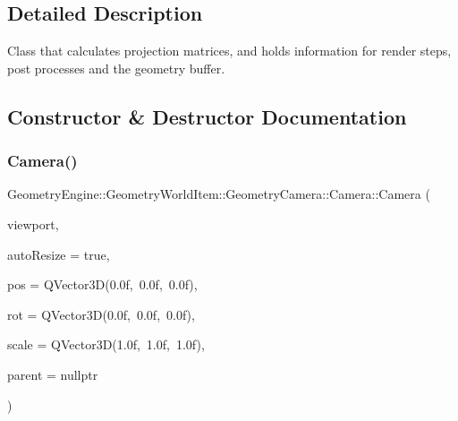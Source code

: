 \subsection{Detailed Description}
Class that calculates projection matrices, and holds information for render steps, post processes and the geometry buffer. 

\subsection{Constructor \& Destructor Documentation}
\mbox{\label{class_geometry_engine_1_1_geometry_world_item_1_1_geometry_camera_1_1_camera_a56a7538e5e5d2141832824bba448e271}} 
\subsubsection{\texorpdfstring{Camera()}{Camera()}\hspace{0.1cm}{\footnotesize\ttfamily [1/2]}}
{\footnotesize\ttfamily Geometry\+Engine\+::\+Geometry\+World\+Item\+::\+Geometry\+Camera\+::\+Camera\+::\+Camera (\begin{DoxyParamCaption}\item[{const \mbox{\hyperlink{class_geometry_engine_1_1_geometry_item_utils_1_1_viewport}{Geometry\+Item\+Utils\+::\+Viewport}} \&}]{viewport,  }\item[{bool}]{auto\+Resize = {\ttfamily true},  }\item[{const Q\+Vector3D \&}]{pos = {\ttfamily QVector3D(0.0f,~0.0f,~0.0f)},  }\item[{const Q\+Vector3D \&}]{rot = {\ttfamily QVector3D(0.0f,~0.0f,~0.0f)},  }\item[{const Q\+Vector3D \&}]{scale = {\ttfamily QVector3D(1.0f,~1.0f,~1.0f)},  }\item[{\mbox{\hyperlink{class_geometry_engine_1_1_geometry_world_item_1_1_world_item}{World\+Item}} $\ast$}]{parent = {\ttfamily nullptr} }\end{DoxyParamCaption})}

